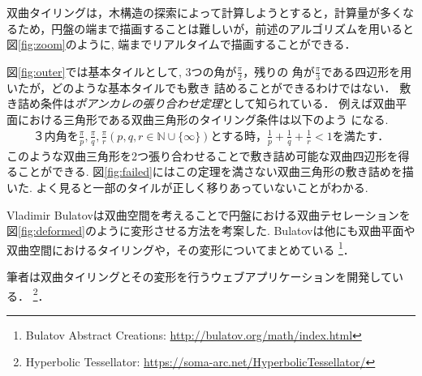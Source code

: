 双曲タイリングは，木構造の探索によって計算しようとすると，計算量が多くな
るため，円盤の端まで描画することは難しいが，前述のアルゴリズムを用いると
図\ref{fig:zoom}のように, 端までリアルタイムで描画することができる．

図\ref{fig:outer}では基本タイルとして, 3つの角が$\frac{\pi}{2}$，残りの
角が$\frac{\pi}{3}$である四辺形を用いたが，どのような基本タイルでも敷き
詰めることができるわけではない．
敷き詰め条件は\emph{ポアンカレの張り合わせ定理}として知られている．
例えば双曲平面における三角形である双曲三角形のタイリング条件は以下のよう
になる.
\begin{eqnarray*}
\text{３内角を}\frac{\pi}{p},\frac{\pi}{q},\frac{\pi}{r} (p, q, r \in
 \mathbb{N} \cup \{\infty\}) \text{とする時，}
 \frac{1}{p} + \frac{1}{q} + \frac{1}{r} < 1 \text{を満たす．}
\end{eqnarray*}
このような双曲三角形を2つ張り合わせることで敷き詰め可能な双曲四辺形を得
ることができる.
図\ref{fig:failed}にはこの定理を満さない双曲三角形の敷き詰めを描いた.
よく見ると一部のタイルが正しく移りあっていないことがわかる.

Vladimir Bulatovは双曲空間を考えることで円盤における双曲テセレーションを
図\ref{fig:deformed}のように変形させる方法を考案した\cite{bending}.
Bulatovは他にも双曲平面や双曲空間におけるタイリングや，その変形についてまとめている
\footnote{Bulatov Abstract Creations: \url{http://bulatov.org/math/index.html}}．

筆者は双曲タイリングとその変形を行うウェブアプリケーションを開発している．
\footnote{Hyperbolic Tessellator: \url{https://soma-arc.net/HyperbolicTessellator/}}．

